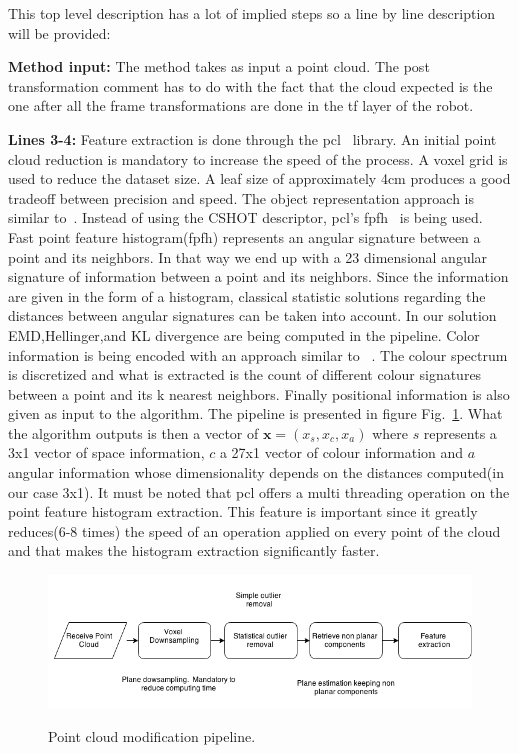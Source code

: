 \documentclass[twoside,hidelinks]{article}
\begin{document}
This top level description has a lot of implied steps so a line by line description will be provided:

\textbf{Method input:} The method takes as input a point cloud. The post transformation comment has to do with the fact that the 
cloud expected is the one after all the frame transformations are done in the tf layer of the robot.

\textbf{Lines 3-4:} Feature extraction is done through the pcl~\cite{pcl} library. An initial point cloud reduction is mandatory to increase the speed of the process. A voxel grid is used to reduce the dataset size. A leaf size of approximately 4cm produces a good tradeoff between precision and speed. The object representation approach is similar to~\cite{objectpointslam}. Instead of using the CSHOT descriptor, pcl's fpfh~\cite{fpfh} is being used. Fast point feature histogram(fpfh) represents an angular signature between a point and its neighbors. In that way we end up with a 23 dimensional angular signature of information between a point and its neighbors. Since the information are given in the form of a histogram, classical statistic solutions regarding the distances between angular signatures can be taken into account. In our solution EMD,Hellinger,and KL divergence are being computed in the pipeline. Color information is being encoded with an approach similar to ~\cite{smcddp}. The colour spectrum is discretized and what is extracted is the count of different colour signatures between a point and its k nearest neighbors. Finally positional information is also given as input to the algorithm. The pipeline is presented in figure Fig.~\ref{pcl:mod}. What the algorithm outputs is then a vector of $ \textbf{x} = (x_s, x_c, x_a) $ where $s$ represents a 3x1 vector of space information, $c$ a 27x1 vector of colour information and $a$ angular information whose dimensionality depends on the distances computed(in our case 3x1). It must be noted that pcl offers a multi threading operation on the point feature histogram extraction. This feature is important since it greatly reduces(6-8 times) the speed of an operation applied on every point of the cloud and that makes the histogram extraction significantly faster.

\begin{figure}[h!]
  \caption{Point cloud modification pipeline.}
  \centering
    \includegraphics[width=1\textwidth]{Basic}
  \label{pcl:mod}
\end{figure}
\end{document}
